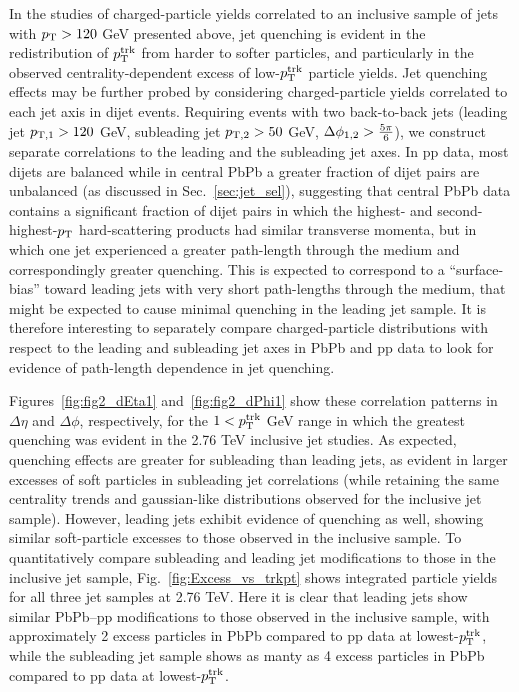 In the studies of charged-particle yields correlated to an inclusive sample of jets with $p_{\rm T} > 120$ GeV presented above, jet quenching is evident in the redistribution of $p_{\rm T}^{\rm trk}$ from harder to softer particles, and particularly in the observed centrality-dependent excess of low-$p_{\rm T}^{\rm trk}$ particle yields.  Jet quenching effects may be further probed by considering charged-particle yields correlated to each jet axis in dijet events.  Requiring events with two back-to-back jets (leading jet $p_{\rm T,1} > 120$ GeV, subleading jet $p_{\rm T,2} > 50$ GeV, $\Delta\phi_{\rm 1,2} > \frac{5\pi}{6}$), we construct separate correlations to the leading and the subleading jet axes.  In pp data, most dijets are balanced while in central PbPb a greater fraction of dijet pairs are unbalanced (as discussed in Sec.~\ref{sec:jet_sel}), suggesting that central PbPb data contains a significant fraction of dijet pairs in which the highest- and second-highest-$p_{\rm T}$ hard-scattering products had similar transverse momenta, but in which one jet experienced a greater path-length through the medium and correspondingly greater quenching.  This is expected to correspond to a ``surface-bias'' toward leading jets with very short path-lengths through the medium, that might be expected to cause minimal quenching in the leading jet sample.  It is therefore interesting to separately compare charged-particle distributions with respect to the leading and subleading jet axes in PbPb and pp data to look for evidence of path-length dependence in jet quenching.  

Figures~\ref{fig:fig2_dEta1} and~\ref{fig:fig2_dPhi1} show these correlation patterns in $\Delta\eta$ and $\Delta\phi$, respectively, for the $1 < p_{\rm T}^{\rm trk}$ GeV range in which the greatest quenching was evident in the 2.76 TeV inclusive jet studies.  As expected, quenching effects are greater for subleading than leading jets, as evident in larger excesses of soft particles in subleading jet correlations (while retaining the same centrality trends and gaussian-like distributions observed for the inclusive jet sample).  However, leading jets exhibit evidence of quenching as well, showing similar soft-particle excesses to those observed in the inclusive sample.  To quantitatively compare subleading and leading jet modifications to those in the inclusive jet sample, Fig.~\ref{fig:Excess_vs_trkpt} shows integrated particle yields for all three jet samples at 2.76 TeV.  Here it is clear that leading jets show similar PbPb--pp modifications to those observed in the inclusive sample, with approximately 2 excess particles in PbPb compared to pp data at lowest-$p_{\rm T}^{\rm trk}$, while the subleading jet sample shows as manty as 4 excess particles in PbPb compared to pp data at lowest-$p_{\rm T}^{\rm trk}$.


